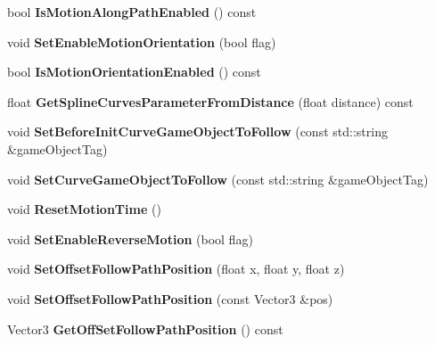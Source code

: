 \begin{DoxyCompactItemize}
\item 
\mbox{\label{classFollowCurvesPathComponent_ad5b43ac975b11fc478e3a20beb4634fc}} 
bool {\bfseries Is\+Motion\+Along\+Path\+Enabled} () const
\item 
\mbox{\label{classFollowCurvesPathComponent_af6dd425939814dc977aad8cd4a774297}} 
void {\bfseries Set\+Enable\+Motion\+Orientation} (bool flag)
\item 
\mbox{\label{classFollowCurvesPathComponent_a7b463c0d943acb832a6e182d3e29d096}} 
bool {\bfseries Is\+Motion\+Orientation\+Enabled} () const
\item 
\mbox{\label{classFollowCurvesPathComponent_a742c9d8bbe754a8207a11956e505dae2}} 
float {\bfseries Get\+Spline\+Curves\+Parameter\+From\+Distance} (float distance) const
\item 
\mbox{\label{classFollowCurvesPathComponent_a4026d047ff1956a546c00d01ea471d70}} 
void {\bfseries Set\+Before\+Init\+Curve\+Game\+Object\+To\+Follow} (const std\+::string \&game\+Object\+Tag)
\item 
\mbox{\label{classFollowCurvesPathComponent_adb34d633e7943b6465e3d41101f47bb8}} 
void {\bfseries Set\+Curve\+Game\+Object\+To\+Follow} (const std\+::string \&game\+Object\+Tag)
\item 
\mbox{\label{classFollowCurvesPathComponent_a2066381c9873ed82c159978ba6158301}} 
void {\bfseries Reset\+Motion\+Time} ()
\item 
\mbox{\label{classFollowCurvesPathComponent_a1676b114b2bb829de5010c18200221f0}} 
void {\bfseries Set\+Enable\+Reverse\+Motion} (bool flag)
\item 
\mbox{\label{classFollowCurvesPathComponent_a2933908450f44d9a49376137f6c36708}} 
void {\bfseries Set\+Offset\+Follow\+Path\+Position} (float x, float y, float z)
\item 
\mbox{\label{classFollowCurvesPathComponent_a0510f04653b219e91a021da837019fe7}} 
void {\bfseries Set\+Offset\+Follow\+Path\+Position} (const Vector3 \&pos)
\item 
\mbox{\label{classFollowCurvesPathComponent_a907ebc75d715442527124883043875ea}} 
Vector3 {\bfseries Get\+Off\+Set\+Follow\+Path\+Position} () const
\end{DoxyCompactItemize}
